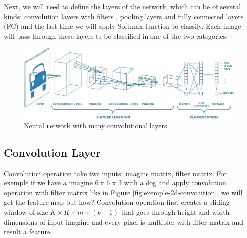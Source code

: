 Next, we will need to define the layers of the network, 
which can be of several kinds: convolution layers with filters , pooling layers and fully connected layers (FC)
and the last time we will apply Softmax function to classify.
 Each image will pass through these layers to be classified in one of the two categories.


 \begin{figure}[htbp]
  \centerline{\includegraphics[scale=0.35]{fig/cnn.jpeg}}  
  \caption{Neural network with many convolutional layers \cite{cnn-mathworks}}
  \label{fig:cnn-arhitecture}
\end{figure}



\subsection{Convolution Layer}

Convolution operation take two inputs: imagine matrix, filter matrix.  
For exemple if we have a imagine 6 x 6 x 3 with a dog and apply convolution operation with filter matrix like in Figure \ref{fig:exemple-2d-convolution},  we will get the feature map but how?
Convolution operation first creates a sliding window of size $K \times K \times m \times (k-1)$ that goes through height and width dimensions of input imagine 
and every pixel is multipler with filter matrix and result a feature. \cite{Mallat:2008:WTS:1525499}

